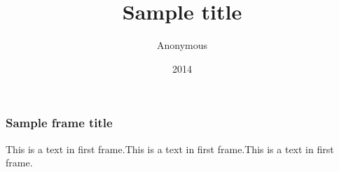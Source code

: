 \documentclass{beamer}
\title{Sample title}
\author{Anonymous}
\institute{ShareLaTeX}
\date{2014}
\begin{document}
\frame{\titlepage}

\begin{frame}
\frametitle{Sample frame title}
This is a text in first frame.This is a text in first frame.This is a text in first frame.
\end{frame}
\end{document}
